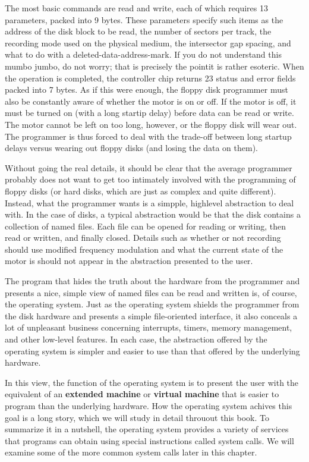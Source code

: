 \documentclass{book}
\newcommand {\kw} [1] {\textbf{#1}}
\begin{document}
The most basic commands are read and write, each of which requires 13 parameters, packed into 9 bytes.
These parameters specify such items as the address of the disk block to be read, the number of sectors per track, 
the recording mode used on the physical medium, the intersector gap spacing, and what to do with a deleted-data-address-mark.
If you do not understand this mumbo jumbo, do not worry; that is precisely the pointit is rather esoteric.
When the operation is completed, the controller chip returns 23 status and error fields packed into 7 bytes.
As if this were enough, the floppy disk programmer must also be constantly aware of whether the motor is on or off.
If the motor is off, it must be turned on (with a long startip delay) before data can be read or write.
The motor cannot be left on too long, however, or the floppy disk will wear out.
The programmer is thus forced to deal with the trade-off between long startup delays versus wearing out floppy disks (and losing the data on them).

Without going the real details, it should be clear that the average programmer probably does not want to 
get too intimately involved with the programming of floppy disks (or hard disks, which are just as complex and quite different).
Instead, what the programmer wants is a simpple, highlevel abstraction to deal with.
In the case of disks, a typical abstraction would be that the disk contains a collection of named files.
Each file can be opened for reading or writing, then read or written, and finally closed.
Details such as whether or not recording should use modified frequency modulation and 
what the current state of the motor is should not appear in the abstraction presented to the user.

The program that hides the truth about the hardware from the programmer and 
presents a nice, simple view of named files can be read and written is, of course, the operating system.
Just as the operating system shields the programmer from the disk hardware and presents a simple file-oriented interface, 
it also conceals a lot of unpleasant business concerning interrupts, timers, memory management, and other low-level features.
In each case, the abstraction offered by the operating system is simpler and easier to use than that offered by the underlying hardware.

In this view, the function of the operating system is to present the user with the equivalent of an \kw{extended machine} or \kw{virtual machine} 
that is easier to program than the underlying hardware.
How the operating system achives this goal is a long story, which we will study in detail throuout this book.
To summarize it in a nutshell, the operating system provides a variety of services 
that programs can obtain using special instructions called system calls.
We will examine some of the more common system calls later in this chapter.
\end{document}
